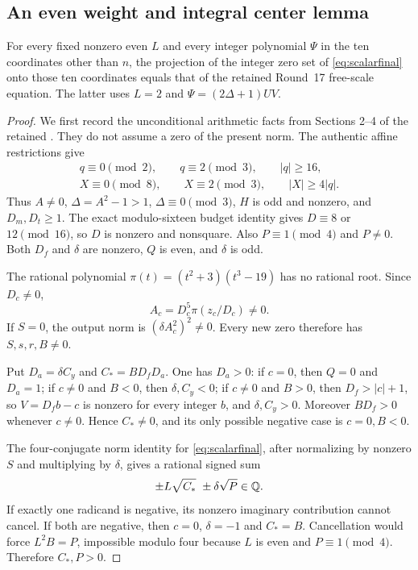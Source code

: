 \subsection{An even weight and integral center lemma}
\begin{theorem}\label{thm:evenweight}
For every fixed nonzero even $L$ and every integer polynomial $\Psi$ in
the ten coordinates other than $n$, the projection of the integer zero
set of \eqref{eq:scalarfinal} onto those ten coordinates equals that of
the retained Round~17 free-scale equation. The latter uses
$L=2$ and $\Psi=(2\Delta+1)UV$.
\end{theorem}
\begin{proof}
We first record the unconditional arithmetic facts from Sections 2--4
of the retained . They do not
assume a zero of the present norm. The authentic affine restrictions give
\begin{gather*}
 q\equiv0\pmod2,\qquad q\equiv2\pmod3,\qquad |q|\ge16,\\
 X\equiv0\pmod8,\qquad X\equiv2\pmod3,\qquad |X|\ge4|q|.
\end{gather*}
Thus $A\ne0$, $\Delta=A^2-1>1$, $\Delta\equiv0\pmod3$,
$H$ is odd and nonzero, and $D_m,D_t\ge1$. The exact modulo-sixteen
budget identity gives $D\equiv8$ or $12\pmod{16}$, so $D$ is nonzero
and nonsquare. Also $P\equiv1\pmod4$ and $P\ne0$.
Both $D_f$ and $\delta$ are nonzero, $Q$ is even, and $\delta$ is odd.

The rational polynomial $\pi(t)=(t^2+3)(t^3-19)$ has no rational root.
Since $D_c\ne0$,
\[
 A_c=D_c^5\pi(z_c/D_c)\ne0.
\]
If $S=0$, the output norm is $(\delta A_c^2)^2\ne0$.
Every new zero therefore has $S,s,r,B\ne0$.

Put $D_a=\delta C_y$ and $C_*=BD_fD_a$. One has $D_a>0$:
if $c=0$, then $Q=0$ and $D_a=1$; if $c\ne0$ and $B<0$,
then $\delta,C_y<0$; if $c\ne0$ and $B>0$, then
$D_f>|c|+1$, so $V=D_fb-c$ is nonzero for every integer $b$, and
$\delta,C_y>0$. Moreover $BD_f>0$ whenever $c\ne0$.
Hence $C_*\ne0$, and its only possible negative case is $c=0,B<0$.

The four-conjugate norm identity for \eqref{eq:scalarfinal}, after
normalizing by nonzero $S$ and multiplying by $\delta$, gives a rational
signed sum
\begin{equation}\label{eq:radicalsum}
 \pm L\sqrt{C_*}\ \pm\delta\sqrt P\in\mathbb Q.
\end{equation}
If exactly one radicand is negative, its nonzero imaginary contribution
cannot cancel. If both are negative, then $c=0$, $\delta=-1$ and
$C_*=B$. Cancellation would force $L^2B=P$, impossible modulo four
because $L$ is even and $P\equiv1\pmod4$. Therefore $C_*,P>0$.


\end{proof}
